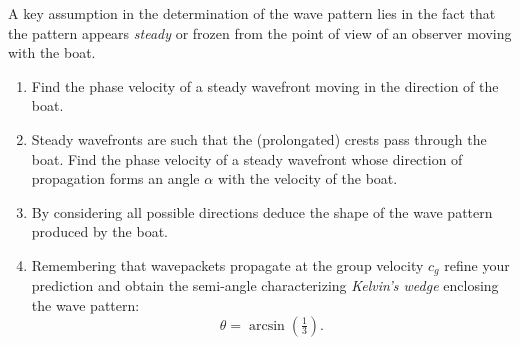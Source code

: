 \documentclass[11pt,a4paper]{article}
\newcommand{\lp}{\left(}
\newcommand{\rp}{\right)}
\begin{document}
A key assumption in the determination of the wave pattern lies in the fact that the pattern appears \textit{steady} or frozen from the point of view of an observer moving with the boat.
\begin{enumerate}[resume]
\item Find the phase velocity of a steady wavefront moving in the direction of the boat.
\item Steady wavefronts are such that the (prolongated) crests pass through the boat. Find the phase velocity of a steady wavefront whose direction of propagation forms an angle  $\alpha$ with the velocity of the boat. 
\item By considering all possible directions deduce the shape of the wave pattern produced by the boat. 
\item Remembering that wavepackets propagate at the group velocity $c_g$ refine your prediction and obtain the semi-angle characterizing \textit{Kelvin's wedge} enclosing the wave pattern:
\begin{equation}
\theta = \arcsin\lp\tfrac{1}{3}\rp.
\end{equation}
\end{enumerate}
\end{document}
